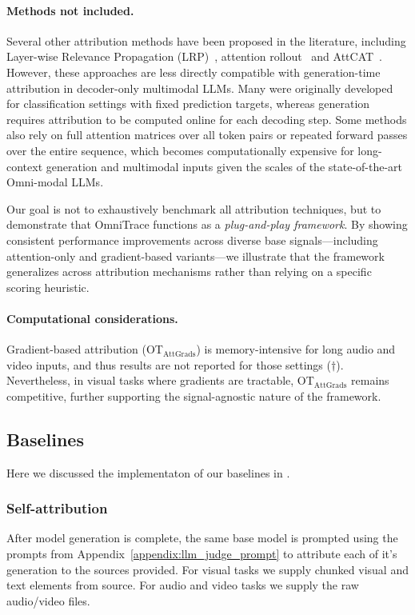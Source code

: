 \paragraph{Methods not included.}
Several other attribution methods have been proposed in the literature, including Layer-wise Relevance Propagation (LRP)~\cite{bach2015pixel}, attention rollout~\cite{abnar-zuidema-2020-quantifying} and AttCAT~\cite{attcat}. 
However, these approaches are less directly compatible with generation-time attribution in decoder-only multimodal LLMs. Many were originally developed for classification settings with fixed prediction targets, whereas generation requires attribution to be computed online for each decoding step. Some methods also rely on full attention matrices over all token pairs or repeated forward passes over the entire sequence, which becomes computationally expensive for long-context generation and multimodal inputs given the scales of the state-of-the-art Omni-modal LLMs.

Our goal is not to exhaustively benchmark all attribution techniques, but to demonstrate that OmniTrace functions as a \emph{plug-and-play framework}. By showing consistent performance improvements across diverse base signals—including attention-only and gradient-based variants—we illustrate that the framework generalizes across attribution mechanisms rather than relying on a specific scoring heuristic.

\paragraph{Computational considerations.}
Gradient-based attribution (OT$_\text{AttGrads}$) is memory-intensive for long audio and video inputs, and thus results are not reported for those settings ($\dagger$).
Nevertheless, in visual tasks where gradients are tractable, OT$_\text{AttGrads}$ remains competitive, further supporting the signal-agnostic nature of the framework.

\subsection{Baselines}
\label{appendix:implementation}
Here we discussed the implementaton of our baselines in .

\subsubsection{Self-attribution} 
After model generation is complete, the same base model is prompted using the prompts from Appendix~\ref{appendix:llm_judge_prompt} to attribute each of it's generation to the sources provided. For visual tasks we supply chunked visual and text elements from source. For audio and video tasks we supply the raw audio/video files.

